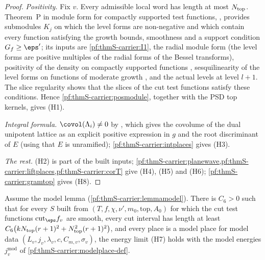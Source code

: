 \begin{proof}
\emph{Positivity.} Fix $v$. Every admissible local word has length at most $N_{\mathrm{top}}$. Theorem~P in module form
for compactly supported test functions, , provides
submodules $K_j$ on which the level forms are non-negative and which contain every function satisfying the growth bounds,
smoothness and a support condition $G_f\ge\eps'$; its inputs are \ref{pf:thmS-carrier:I1}, the radial module form
 (the level forms are positive multiples of the radial forms of the
Bessel transforms), positivity of the density on compactly supported functions
, sesquilinearity of the level forms on functions of
moderate growth , and the actual levels at level $l+1$.
The slice regularity shows that the slices of the cut test functions satisfy these conditions. Hence
\cref{pf:thmS-carrier:posmodule}, together with the PSD top kernels, gives (H1).

\emph{Integral formula.} $\covol(\Lambda_i)\ne0$ by ,
which gives the covolume of the dual unipotent lattice as an explicit positive expression in $g$ and the root discriminant of
$E$ (using that $E$ is unramified); \cref{pf:thmS-carrier:intplaces} gives (H3).

\emph{The rest.} (H2) is part of the built inputs; \cref{pf:thmS-carrier:planewave,pf:thmS-carrier:liftplaces,pf:thmS-carrier:corT}
give (H4), (H5) and (H6); \cref{pf:thmS-carrier:gramtop} gives (H8).
\end{proof}

\begin{lemma}\label{pf:thmS-carrier:lemE}
Assume the model lemma (\cref{pf:thmS-carrier:lemmamodel}). There is $C_6>0$ such that for every $S$ built from
$(T,f,\chi,\nu',m_0,\mathrm{top},A_0)$ for which the cut test functions $\mathrm{cut}_\eps f_v$ are smooth, every cut interval
has length at least $C_6\bigl(kN_{\mathrm{top}}(r+1)^2+N_{\mathrm{top}}^2(r+1)^2\bigr)$, and every place is a model place for
model data $(L_v,j_v,\lambda_v,c,C_{m,v},\sigma_v)$, the energy limit (H7) holds with the model energies
$j^{\mathrm{mod}}_v$ of \cref{pf:thmS-carrier:modelplace-def}.
\end{lemma}

